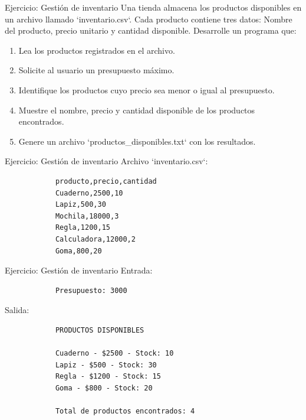 \documentclass{beamer}
\begin{document}
    \begin{frame}[fragile, t]{Ejercicio: Gestión de inventario}
        Una tienda almacena los productos disponibles en un archivo llamado `inventario.csv`. Cada producto contiene tres datos: 
        Nombre del producto, precio unitario y cantidad disponible. Desarrolle un programa que:
        \begin{enumerate}
            \item Lea los productos registrados en el archivo.
            \item Solicite al usuario un presupuesto máximo.
            \item Identifique los productos cuyo precio sea menor o igual al presupuesto.
            \item Muestre el nombre, precio y cantidad disponible de los productos encontrados.
            \item Genere un archivo `productos\_disponibles.txt` con los resultados.
        \end{enumerate}
    \end{frame}

    \begin{frame}[fragile, t]{Ejercicio: Gestión de inventario}
        Archivo `inventario.csv`:
        \begin{verbatim}
            producto,precio,cantidad
            Cuaderno,2500,10
            Lapiz,500,30
            Mochila,18000,3
            Regla,1200,15
            Calculadora,12000,2
            Goma,800,20
        \end{verbatim}
    \end{frame}

    \begin{frame}[fragile, t]{Ejercicio: Gestión de inventario}
        Entrada:
        \begin{verbatim}
            Presupuesto: 3000
        \end{verbatim}
        Salida:
        \begin{verbatim}
            PRODUCTOS DISPONIBLES

            Cuaderno - $2500 - Stock: 10
            Lapiz - $500 - Stock: 30
            Regla - $1200 - Stock: 15
            Goma - $800 - Stock: 20

            Total de productos encontrados: 4
        \end{verbatim}
    \end{frame}
\end{document}
